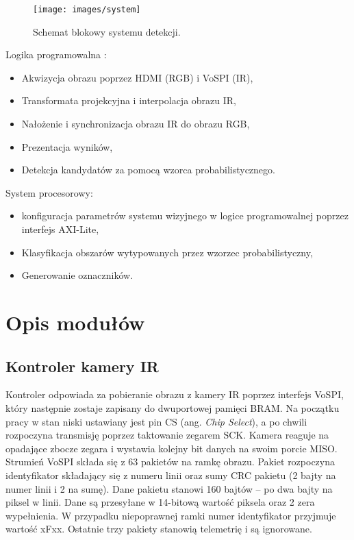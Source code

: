 \begin{figure}[h]
    \centering
    \texttt{[image: images/system]}
    \caption{Schemat blokowy systemu detekcji.}
    \label{fig:systemwizyjny}
\end{figure}

Logika programowalna :
\begin{itemize}
\item Akwizycja obrazu poprzez HDMI (RGB) i VoSPI (IR),
\item Transformata projekcyjna i interpolacja obrazu IR,
\item Nałożenie i synchronizacja obrazu IR do obrazu RGB,
\item Prezentacja wyników,
\item Detekcja kandydatów za pomocą wzorca probabilistycznego.
\end{itemize}
System procesorowy:
\begin{itemize}
\item konfiguracja parametrów systemu wizyjnego w logice programowalnej poprzez interfejs AXI-Lite,
\item Klasyfikacja obszarów wytypowanych przez wzorzec probabilistyczny,
\item Generowanie oznaczników. %
\end{itemize}

\section{Opis modułów}


\subsection{Kontroler kamery IR}

Kontroler odpowiada za pobieranie obrazu z kamery IR poprzez interfejs VoSPI, który następnie zostaje zapisany do dwuportowej pamięci BRAM. 
Na początku pracy w stan niski ustawiany jest pin CS (ang. \textit{Chip Select}), a po chwili rozpoczyna transmisję poprzez taktowanie zegarem SCK. %
Kamera reaguje na opadające zbocze zegara i wystawia kolejny bit danych na swoim porcie MISO. %
Strumień VoSPI składa się z 63 pakietów na ramkę obrazu. 
Pakiet rozpoczyna identyfikator składający się z numeru linii oraz sumy CRC pakietu (2 bajty na numer linii i 2 na sumę). 
Dane pakietu stanowi 160 bajtów -- po dwa bajty na piksel w linii. 
Dane są przesyłane w 14-bitową wartość piksela oraz 2 zera wypełnienia. %
W przypadku niepoprawnej ramki numer identyfikator przyjmuje wartość xFxx. 
Ostatnie trzy pakiety stanowią telemetrię i są ignorowane. %

